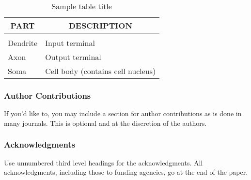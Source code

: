 \begin{table}[t]
	\caption{Sample table title}
	\label{sample-table}
	\begin{center}
		\begin{tabular}{ll}
			\multicolumn{1}{c}{\bf PART} & \multicolumn{1}{c}{\bf DESCRIPTION}
			\\ \hline \\
			Dendrite                     & Input terminal                      \\
			Axon                         & Output terminal                     \\
			Soma                         & Cell body (contains cell nucleus)   \\
		\end{tabular}
	\end{center}
\end{table}

\subsubsection*{Author Contributions}
If you'd like to, you may include  a section for author contributions as is done
in many journals. This is optional and at the discretion of the authors.

\subsubsection*{Acknowledgments}
Use unnumbered third level headings for the acknowledgments. All
acknowledgments, including those to funding agencies, go at the end of the paper.



